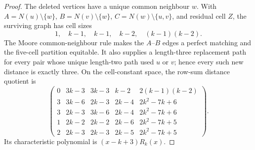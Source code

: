 \documentclass[a4paper,10pt,reqno]{amsart}
\theoremstyle{plain}
\theoremstyle{definition}
\theoremstyle{remark}
\begin{document}
\begin{proof}
The deleted vertices have a unique common neighbour \(w\).  With
\(A=N(u)\setminus\{w\}\), \(B=N(v)\setminus\{w\}\),
\(C=N(w)\setminus\{u,v\}\), and residual cell \(Z\), the surviving graph
has cell sizes
\[
 1,\quad k-1,\quad k-1,\quad k-2,\quad (k-1)(k-2).
\]
The Moore common-neighbour rule makes the \(A\)--\(B\) edges a perfect
matching and the five-cell partition equitable.  It also supplies a
length-three replacement path for every pair whose unique length-two path
used \(u\) or \(v\); hence every such new distance is exactly three.  On the
cell-constant space, the row-sum distance quotient is
\[
\begin{pmatrix}
0&3k-3&3k-3&k-2&2(k-1)(k-2)\\
3&3k-6&2k-3&2k-4&2k^2-7k+6\\
3&2k-3&3k-6&2k-4&2k^2-7k+6\\
1&2k-2&2k-2&2k-6&2k^2-7k+5\\
2&2k-3&2k-3&2k-5&2k^2-7k+5
\end{pmatrix}.
\]
Its characteristic polynomial is \((x-k+3)R_k(x)\).


\end{proof}
\end{document}
